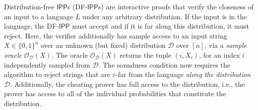 \documentclass[11pt]{article}
\newcommand{\IPP}{\mathsf{IPP}}
\begin{document}
Distribution-free $\IPP$s (DF-$\IPP$s) are interactive proofs that verify the closeness of an input to a language $L$ under any arbitrary distribution. If the input is in the language, the DF-$\IPP$ must accept and if it is far along this distribution, it must reject. Here, the verifier additionally has sample access to an input string $X\in \{0,1\}^{n}$ over an unknown (but fixed) distribution $\mathcal{D}$ over $[n]$, via a \textit{sample oracle} $\mathcal{O}_\mathcal{D}(X)$. The oracle $\mathcal{O}_\mathcal{D}(X)$ returns the tuple $(i,X_i)$, for an index $i$ independently sampled from $\mathcal{D}$. The soundness condition now requires the algorithm to reject strings that are $\varepsilon$-far from the language \emph{along the distribution $\mathcal{D}$}. Additionally, the cheating prover has full access to the distribution, i.e., the prover has access to all of the individual probabilities that constitute the distribution.
 
\end{document}
